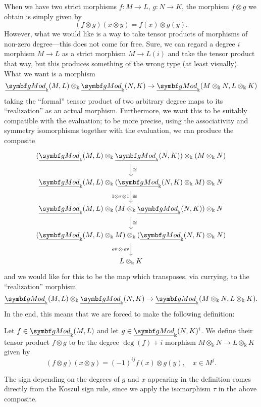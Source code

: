 When we have two strict morphisms \(f\!:M \to L\), \(g\!:N\to K\), the morphism \(f\otimes g\) we obtain is simply given by
\[ (f\otimes g)(x\otimes y) = f(x)\otimes g(y). \]
However, what we would like is a way to take tensor products of morphisms of non-zero degree---this does not come for free. Sure, we can
regard a degree \(i\) morphism \(M \to L\) as a strict morphism \(M \to L(i)\) and take the tensor product that way, but this produces something
of the wrong type (at least visually). What we want is a morphism
\[ \ugMod_\Bbbk(M,L) \otimes_\Bbbk \ugMod_\Bbbk(N,K) \to \ugMod_\Bbbk(M\otimes_\Bbbk N, L\otimes_\Bbbk K) \]
taking the ``formal'' tensor product of two arbitrary degree maps to its ``realization'' as an actual morphism. Furthermore, we want this
to be suitably compatible with the evaluation; to be more precise, using the associativity and symmetry isomorphisms together with the evaluation, we can produce
the composite
\[
	\begin{tikzcd}
		(\ugMod_\Bbbk(M,L) \otimes_\Bbbk \ugMod_\Bbbk(N,K))\otimes_\Bbbk (M\otimes_\Bbbk N) \ar[d,"\cong"] \\
		\ugMod_\Bbbk(M,L) \otimes_\Bbbk (\ugMod_\Bbbk(N,K) \otimes_\Bbbk M) \otimes_\Bbbk N \ar[d,"1\otimes\tau\otimes 1"',"\cong"] \\
		\ugMod_\Bbbk(M,L) \otimes_\Bbbk ( M\otimes_\Bbbk \ugMod_\Bbbk(N,K)) \otimes_\Bbbk N \ar[d,"\cong"] \\
		(\ugMod_\Bbbk(M,L) \otimes_\Bbbk M) \otimes_\Bbbk (\ugMod_\Bbbk(N,K) \otimes_\Bbbk N)\ar[d,"\ev\otimes\ev"'] \\
		L\otimes_\Bbbk K
	\end{tikzcd}
\]
and we would like for this to be the map which transposes, via currying, to the ``realization'' morphism
\[ \ugMod_\Bbbk(M,L) \otimes_\Bbbk \ugMod_\Bbbk(N,K) \to \ugMod_\Bbbk(M\otimes_\Bbbk N, L\otimes_\Bbbk K). \]
In the end, this means that we are forced to make the following definition:
\begin{definition}
	Let \(f\in\ugMod_\Bbbk(M,L)\) and let \(g\in\ugMod_\Bbbk(N,K)^i\). We define their tensor product \(f\otimes g\) to be the
	degree \(\deg(f) + i\) morphism \(M\otimes_\Bbbk N \to L\otimes_\Bbbk K\) given by
	\[ (f\otimes g)(x\otimes y) = (-1)^{ij}f(x)\otimes g(y),\quad x\in M^j. \]
\end{definition}
\begin{remark}
	The sign depending on the degrees of \(g\) and \(x\) appearing in the definition comes directly from the Koszul sign rule, since we apply the isomorphism \(\tau\)
	in the above composite.
\end{remark}

